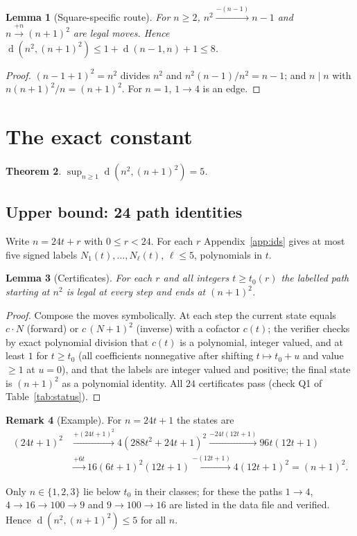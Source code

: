 \documentclass[11pt]{article}
\newtheorem{theorem}{Theorem}[section]
\newtheorem{lemma}[theorem]{Lemma}
\theoremstyle{definition}
\newtheorem{remark}[theorem]{Remark}
\newcommand{\dist}{\operatorname{d}}
\begin{document}
\begin{lemma}[Square-specific route]\label{lem:sq8}
For $n\ge2$, $n^2\xrightarrow{-(n-1)}n-1$ and $n\xrightarrow{+n}(n+1)^2$ are legal moves. Hence $\dist(n^2,(n+1)^2)\le 1+\dist(n-1,n)+1\le8$.
\end{lemma}
\begin{proof} $(n-1+1)^2=n^2$ divides $n^2$ and $n^2(n-1)/n^2=n-1$; and $n\mid n$ with $n(n+1)^2/n=(n+1)^2$. For $n=1$, $1\to4$ is an edge. \end{proof}

\section{The exact constant}\label{sec:main}
\begin{theorem}\label{thm:main}
$\sup_{n\ge1}\dist(n^2,(n+1)^2)=5$.
\end{theorem}

\subsection{Upper bound: 24 path identities}
Write $n=24t+r$ with $0\le r<24$. For each $r$ Appendix~\ref{app:ids} gives at most five signed labels $N_1(t),\dots,N_\ell(t)$, $\ell\le5$, polynomials in $t$.
\begin{lemma}[Certificates]\label{lem:cert}
For each $r$ and all integers $t\ge t_0(r)$ the labelled path starting at $n^2$ is legal at every step and ends at $(n+1)^2$.
\end{lemma}
\begin{proof} Compose the moves symbolically. At each step the current state equals $c\cdot N$ (forward) or $c\,(N+1)^2$ (inverse) with a cofactor $c(t)$; the verifier checks by exact polynomial division
that $c(t)$ is a polynomial, integer valued, and at least $1$ for $t\ge t_0$ (all coefficients nonnegative after shifting $t\mapsto t_0+u$ and value $\ge1$ at $u=0$), and that the labels are integer valued and positive; the final state is $(n+1)^2$ as a polynomial identity.
All $24$ certificates pass (check Q1 of Table~\ref{tab:status}). \end{proof}
\begin{remark}[Example] For $n=24t+1$ the states are
\begin{align*}
(24t{+}1)^2&\xrightarrow{+(24t+1)^2}4(288t^2{+}24t{+}1)^2\xrightarrow{-24t(12t+1)}96t(12t{+}1)\\
&\xrightarrow{+6t}16(6t{+}1)^2(12t{+}1)\xrightarrow{-(12t+1)}4(12t{+}1)^2=(n+1)^2.
\end{align*}
\end{remark}
Only $n\in\{1,2,3\}$ lie below $t_0$ in their classes; for these the paths $1\to4$, $4\to16\to100\to9$ and $9\to100\to16$ are listed in the data file and verified. Hence $\dist(n^2,(n+1)^2)\le5$ for all $n$.
\end{document}
